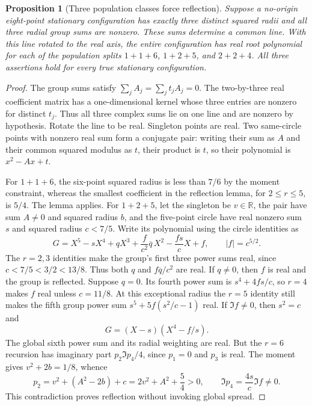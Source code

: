 \documentclass[11pt]{article}
\newtheorem{proposition}[theorem]{Proposition}
\theoremstyle{remark}
\numberwithin{equation}{section}
\begin{document}
\begin{proposition}[Three population classes force reflection]
\label{prop:n8-oct7-reflected-classes}
Suppose a no-origin eight-point stationary configuration has exactly
three distinct squared radii and all three radial group sums are
nonzero. These sums determine a common line. With this line rotated
to the real axis, the entire configuration has real root polynomial
for each of the population splits $1+1+6$, $1+2+5$, and $2+2+4$.
All three assertions hold for every true stationary configuration.
\end{proposition}
\begin{proof}
The group sums satisfy $\sum_j A_j=\sum_j t_jA_j=0$.
The two-by-three real coefficient matrix has a one-dimensional kernel
whose three entries are nonzero for distinct $t_j$. Thus all three
complex sums lie on one line and are nonzero by hypothesis. Rotate
the line to be real. Singleton points are real. Two same-circle
points with nonzero real sum form a conjugate pair: writing their
sum as $A$ and their common squared modulus as $t$, their product
is $t$, so their polynomial is $x^2-Ax+t$.

For $1+1+6$, the six-point squared radius is less than $7/6$ by the
moment constraint, whereas the smallest coefficient in the reflection
lemma, for $2\le r\le5$, is $5/4$. The lemma applies.
For $1+2+5$, let the singleton be $v\in\mathbb R$, the pair have
sum $A\ne0$ and squared radius $b$, and the five-point circle have
real nonzero sum $s$ and squared radius $c<7/5$. Write its polynomial
using the circle identities as
\[
 G=X^5-sX^4+qX^3+\frac f{c^2}\overline q\,X^2
                    -\frac{fs}{c}X+f,\qquad |f|=c^{5/2}.
\]
The $r=2,3$ identities make the group's first three power sums real,
since $c<7/5<3/2<13/8$. Thus both $q$ and
$f\overline q/c^2$ are real. If $q\ne0$, then $f$ is real and the
group is reflected. Suppose $q=0$. Its fourth power sum is
$s^4+4fs/c$, so $r=4$ makes $f$ real unless $c=11/8$.
At this exceptional radius the $r=5$ identity still makes the fifth
group power sum $s^5+5f(s^2/c-1)$ real. If $\Im f\ne0$, then
$s^2=c$ and
\[
                         G=(X-s)(X^4-f/s).
\]
The global sixth power sum and its radial weighting are real.
But the $r=6$ recursion has imaginary part
$p_2\Im p_4/4$, since $p_1=0$ and $p_3$ is real. The moment gives
$v^2+2b=1/8$, whence
\[
 p_2=v^2+(A^2-2b)+c=2v^2+A^2+\frac54>0,
 \qquad \Im p_4=\frac{4s}{c}\Im f\ne0.
\]
This contradiction proves reflection without invoking global spread.


\end{proof}
\end{document}
